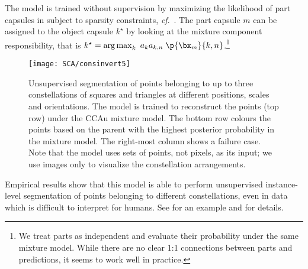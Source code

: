 The model is trained without supervision by maximizing the likelihood of part capsules in  subject to sparsity constraints, \textit{cf}.\ .
The part capsule $m$ can be assigned to the object capsule $k^\star$ by looking at the mixture component responsibility, that is $k^\star = \operatorname{arg\,max}_{k}~a_k a_{k,n}\;\p{\bx_m}{k,n}$.\footnote{We treat parts as independent and evaluate their probability under the same mixture model. While there are no clear 1:1 connections between parts and predictions, it seems to work well in practice.}
\begin{figure} 
	\centering
		\texttt{[image: SCA/consinvert5]}
		\caption{
			Unsupervised segmentation of points belonging to up to three constellations of squares and triangles at different positions, scales and orientations. 
			The model is trained to reconstruct the points (top row) under the \gls{CCAu} mixture model. The bottom row colours the points based on the parent with the highest posterior probability in the mixture model. 
			The right-most column shows a failure case.
			Note that the model uses sets of points, not pixels, as its input; we use images  only to visualize the constellation arrangements.
		}
		\label{fig:constellations}
\end{figure}
Empirical results show that this model is able to perform unsupervised instance-level segmentation of points belonging to different constellations, even in data which is difficult to interpret for humans. See  for an example and  for details.

